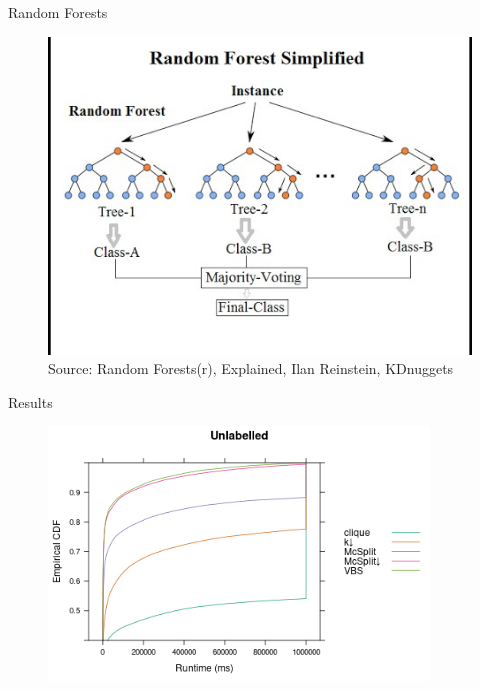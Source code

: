 \documentclass{beamer}
\begin{document}
\begin{frame}{Random Forests \parencite{DBLP:journals/ml/Breiman01}}
  \begin{figure}
    \centering
    \includegraphics[scale=0.5]{rand-forest-1.jpg} \\
    {\tiny\color{gray}Source: Random Forests(r), Explained, Ilan Reinstein, KDnuggets}
  \end{figure}
\end{frame}

\begin{frame}{Results}
  \begin{figure}
    \centering
    \includegraphics[width=0.9\textwidth]{../dissertation/images/ecdf_unlabelled.png}
  \end{figure}
\end{frame}
\end{document}
